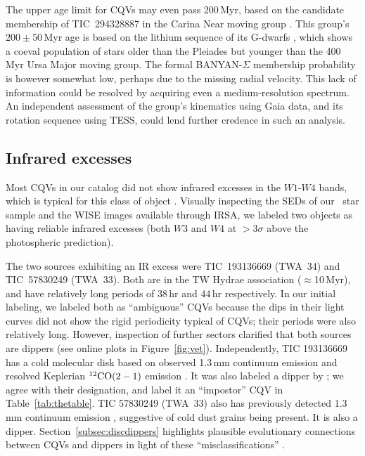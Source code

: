 \documentclass[11pt,twocolumn,tighten]{aastex63}
\begin{document}
The upper age limit for CQVs may even pass 200\,Myr, based on the
candidate membership of TIC~294328887 in the Carina Near moving group
\citep{2006ApJ...649L.115Z}.  This group's $200 \pm 50$\,Myr age is
based on the lithium sequence of its G-dwarfs
\citep{2006ApJ...649L.115Z}, which shows a coeval population of stars
older than the Pleiades but younger than the 400\,Myr Ursa Major
moving group.  The formal BANYAN-$\Sigma$ membership probability is
however somewhat low, perhaps due to the missing radial velocity.
This lack of information could be resolved by acquiring even a
medium-resolution spectrum.  An independent assessment of the group's
kinematics using Gaia data, and its rotation sequence using TESS,
could lend further credence in such an analysis.


\subsection{Infrared excesses}
\label{subsec:irexcess}

Most CQVs in our catalog did not show infrared excesses in the
$W1$-$W4$ bands, which is typical for this class of object
\citep{2017AJ....153..152S}.  Visually inspecting the SEDs of our
\nallcands\ star sample and the WISE images available through IRSA, we
labeled two objects as having reliable infrared excesses (both $W3$
and $W4$ at $>$3$\sigma$ above the photospheric prediction).

The two sources exhibiting an IR excess were TIC~193136669 (TWA~34)
and TIC~57830249 (TWA~33).  Both are in the TW Hydrae association
($\approx$10\,Myr), and have relatively long periods of 38\,hr and
44\,hr respectively.  In our initial labeling, we labeled both as
``ambiguous'' CQVs because the dips in their light curves did not show
the rigid periodicity typical of CQVs;  their periods were also
relatively long.  However, inspection of further sectors clarified
that both sources are dippers (see online plots in
Figure~\ref{fig:vet}).  Independently, TIC 193136669 has a cold
molecular disk based on observed 1.3\,mm continuum emission and
resolved Keplerian $^{12}{\rm CO}(2-1)$ emission
\citep{2015A&A...582L...5R}.  It was also labeled a dipper by
\citet{2022ApJS..263...14C}; we agree with their designation, and
label it an ``impostor'' CQV in Table~\ref{tab:thetable}.  TIC
57830249 (TWA~33) also has previously detected 1.3\,mm continuum
emission \citep{2015A&A...582L...5R}, suggestive of cold dust grains
being present.  It is also a dipper.  Section~\ref{subsec:discdippers}
highlights plausible evolutionary connections between CQVs and dippers
in light of these ``misclassifications'' .
\end{document}
